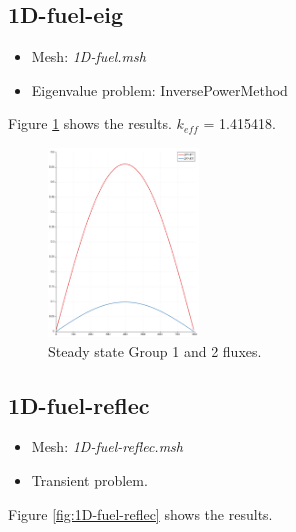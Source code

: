 \documentclass[11pt,letterpaper]{article}
\begin{document}
\subsection{1D-fuel-eig}

	\begin{itemize}
		\item Mesh: \textit{1D-fuel.msh}
		\item Eigenvalue problem: InversePowerMethod
	\end{itemize}

Figure \ref{fig:1D-fuel-eig} shows the results. $k_{eff}$ = 1.415418.

	\begin{figure}[htbp!]
		\centering
		\includegraphics[height=5cm]{1D-fuel-eig}
		\caption{Steady state Group 1 and 2 fluxes.}
		\label{fig:1D-fuel-eig}
	\end{figure}

\subsection{1D-fuel-reflec}

	\begin{itemize}
		\item Mesh: \textit{1D-fuel-reflec.msh}
		\item Transient problem.
	\end{itemize}

Figure \ref{fig:1D-fuel-reflec} shows the results.
\end{document}
